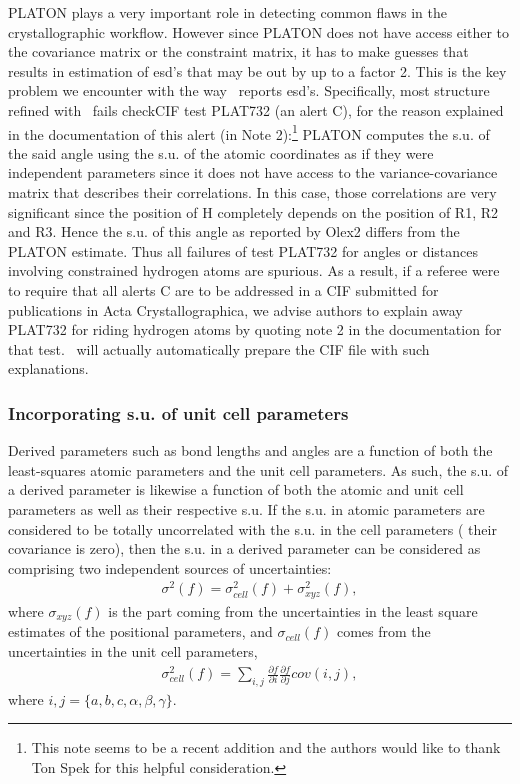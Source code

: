 \documentclass[11pt]{article}
\newcommand{\partialder}[2]{\frac{\partial #1}{\partial #2}}
\begin{document}
PLATON plays a very important role in detecting common flaws in the crystallographic workflow. However since PLATON does not have access either to the covariance matrix or the constraint matrix, it has to make guesses that results in estimation of esd's that may be out by up to a factor 2. This is the key problem we encounter with the way \olexrefine\ reports esd's. Specifically, most structure refined with \olexrefine\ fails checkCIF test PLAT732 (an alert C), for the reason explained in the documentation of this alert (in Note 2):\footnote{This note seems to be a recent addition and the authors would like to thank Ton Spek for this helpful consideration.} PLATON computes the s.u. of the said angle using the s.u. of the atomic coordinates as if they were independent parameters since it does not have access to the variance-covariance matrix that describes their correlations. In this case, those correlations are very significant since the position of H completely depends on the position of R1, R2 and R3. Hence the s.u. of this angle as reported by Olex2 differs from the PLATON estimate. Thus all failures of test PLAT732 for angles or distances involving constrained hydrogen atoms are spurious. As a result, if a referee were to require that all alerts C are to be addressed in a CIF submitted for publications in Acta Crystallographica, we advise authors to explain away PLAT732 for riding hydrogen atoms by quoting note 2 in the documentation for that test. \olexrefine\ will actually automatically prepare the CIF file with such explanations.

\subsubsection{Incorporating s.u. of unit cell parameters}

Derived parameters such as bond lengths and angles are a function of both the least-squares atomic parameters and the unit cell parameters. As such, the s.u. of a derived parameter is likewise a function of both the atomic and unit cell parameters as well as their respective s.u. If the s.u. in atomic parameters are considered to be totally uncorrelated with the s.u. in the cell parameters ( their covariance is zero), then the s.u. in a derived parameter can be considered as comprising two independent sources of uncertainties:
\begin{align}
\sigma^2(f) = \sigma^2_{cell}(f) + \sigma^2_{xyz}(f)
\label{eqn:sigma_d},
\end{align}
where $\sigma_{xyz}(f)$ is the part coming from the uncertainties in the least square estimates of the positional parameters, and $\sigma_{cell}(f)$ comes from the uncertainties in the unit cell parameters,
\begin{align}
\sigma^2_{cell}(f) = \sum_{i,j}{{\partialder{f}{i}\partialder{f}{j} cov\left(i,j\right)}}
\label{eqn:sigma_cell},
\end{align}
where $i,j=\lbrace{a,b,c,\alpha,\beta,\gamma\rbrace}$.
\end{document}
